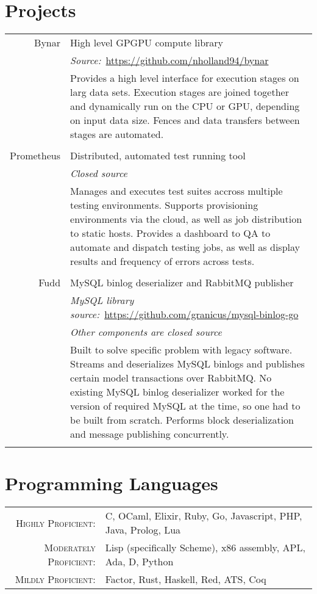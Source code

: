 \documentclass[a4paper,10pt]{article}
\begin{document}
\section{Projects}
\begin{tabular}{r|p{11cm}}
  Bynar       & High level GPGPU compute library\\
              & \emph{Source:}\ \href{https://github.com/nholland94/bynar}{https://github.com/nholland94/bynar}\\
              & \footnotesize{Provides a high level interface for execution stages on larg data sets. Execution stages are joined together and dynamically run on the CPU or GPU, depending on input data size. Fences and data transfers between stages are automated.}\\
  \multicolumn{2}{c}{}\\

  Prometheus  & Distributed, automated test running tool\\
              & \emph{Closed source}\\
              & \footnotesize{Manages and executes test suites accross multiple testing environments. Supports provisioning environments via the cloud, as well as job distribution to static hosts. Provides a dashboard to QA to automate and dispatch testing jobs, as well as display results and frequency of errors across tests.}\\
  \multicolumn{2}{c}{}\\

  Fudd        & MySQL binlog deserializer and RabbitMQ publisher\\
              & \emph{MySQL library source:}\ \href{https://github.com/granicus/mysql-binlog-go}{https://github.com/granicus/mysql-binlog-go}\\
              & \emph{Other components are closed source}\\
              & \footnotesize{Built to solve specific problem with legacy software. Streams and deserializes MySQL binlogs and publishes certain model transactions over RabbitMQ. No existing MySQL binlog deserializer worked for the version of required MySQL at the time, so one had to be built from scratch. Performs block deserialization and message publishing concurrently.}\\
  \multicolumn{2}{c}{}\\
\end{tabular}

\section{Programming Languages}
\begin{tabular}{rl}
  \textsc{Highly Proficient:}     & C, OCaml, Elixir, Ruby, Go, Javascript, PHP, Java, Prolog, Lua\\
  \textsc{Moderately Proficient:} & Lisp (specifically Scheme), x86 assembly, APL, Ada, D, Python\\
  \textsc{Mildly Proficient:}     & Factor, Rust, Haskell, Red, ATS, Coq\\
\end{tabular}
\end{document}
